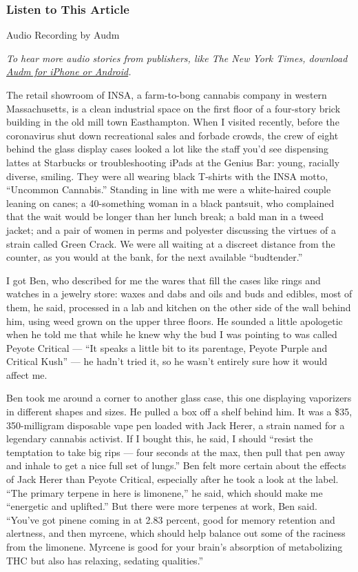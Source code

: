 \hypertarget{listen-to-this-article}{%
\subsubsection{Listen to This Article}\label{listen-to-this-article}}

Audio Recording by Audm

\emph{To hear more audio stories from publishers, like The New York
Times, download}
\href{https://www.audm.com/?utm_source=nytmag\&utm_medium=embed\&utm_campaign=decoding-cannabis}{\emph{Audm
for iPhone or Android}}\emph{.}

The retail showroom of INSA, a farm-to-bong cannabis company in western
Massachusetts, is a clean industrial space on the first floor of a
four-story brick building in the old mill town Easthampton. When I
visited recently, before the coronavirus shut down recreational sales
and forbade crowds, the crew of eight behind the glass display cases
looked a lot like the staff you'd see dispensing lattes at Starbucks or
troubleshooting iPads at the Genius Bar: young, racially diverse,
smiling. They were all wearing black T-shirts with the INSA motto,
``Uncommon Cannabis.'' Standing in line with me were a white-haired
couple leaning on canes; a 40-something woman in a black pantsuit, who
complained that the wait would be longer than her lunch break; a bald
man in a tweed jacket; and a pair of women in perms and polyester
discussing the virtues of a strain called Green Crack. We were all
waiting at a discreet distance from the counter, as you would at the
bank, for the next available ``budtender.''

I got Ben, who described for me the wares that fill the cases like rings
and watches in a jewelry store: waxes and dabs and oils and buds and
edibles, most of them, he said, processed in a lab and kitchen on the
other side of the wall behind him, using weed grown on the upper three
floors. He sounded a little apologetic when he told me that while he
knew why the bud I was pointing to was called Peyote Critical --- ``It
speaks a little bit to its parentage, Peyote Purple and Critical Kush''
--- he hadn't tried it, so he wasn't entirely sure how it would affect
me.

Ben took me around a corner to another glass case, this one displaying
vaporizers in different shapes and sizes. He pulled a box off a shelf
behind him. It was a \$35, 350-milligram disposable vape pen loaded with
Jack Herer, a strain named for a legendary cannabis activist. If I
bought this, he said, I should ``resist the temptation to take big rips
--- four seconds at the max, then pull that pen away and inhale to get a
nice full set of lungs.'' Ben felt more certain about the effects of
Jack Herer than Peyote Critical, especially after he took a look at the
label. ``The primary terpene in here is limonene,'' he said, which
should make me ``energetic and uplifted.'' But there were more terpenes
at work, Ben said. ``You've got pinene coming in at 2.83 percent, good
for memory retention and alertness, and then myrcene, which should help
balance out some of the raciness from the limonene. Myrcene is good for
your brain's absorption of metabolizing THC but also has relaxing,
sedating qualities.''

